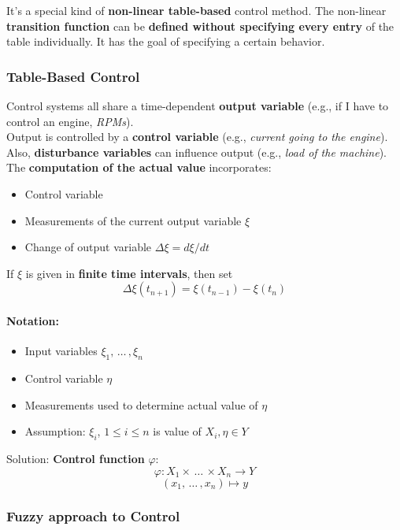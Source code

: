It's a special kind of \textbf{non-linear table-based} control method. The non-linear \textbf{transition function} can be \textbf{defined without specifying every entry} of the table individually. It has the goal of specifying a certain behavior.\\

\subsubsection{Table-Based Control}
Control systems all share a time-dependent \textbf{output variable} (e.g., if I have to control an engine, \textit{RPMs}).\\
Output is controlled by a \textbf{control variable} (e.g., \textit{current going to the engine}).\\
Also, \textbf{disturbance variables} can influence output (e.g., \textit{load of the machine}).\\

The \textbf{computation of the actual value} incorporates: 
\begin{itemize}
	\item Control variable
	\item Measurements of the current output variable $\xi$
	\item Change of output variable $\Delta \xi = d\xi / dt$
\end{itemize}

If $\xi$ is given in \textbf{finite time intervals}, then set 
$$ \Delta \xi (t_{n+1}) = \xi (t_{n-1}) - \xi (t_n) $$

\paragraph{Notation:}
\begin{itemize}
	\item Input variables $\xi_1, \, \dots \, , \xi_n$
	\item Control variable $\eta$
	\item Measurements used to determine actual value of $\eta$
	\item Assumption: $\xi_i$, $1 \leq i \leq n$ is value of $X_i, \eta \in Y$
\end{itemize}

Solution: \textbf{Control function} $\varphi$:
$$ \varphi: X_1 \times \, \dots \, \times X_n \rightarrow Y $$
$$ (x_1, \, \dots \, , x_n) \mapsto y $$

\newpage

\subsubsection{Fuzzy approach to Control}

